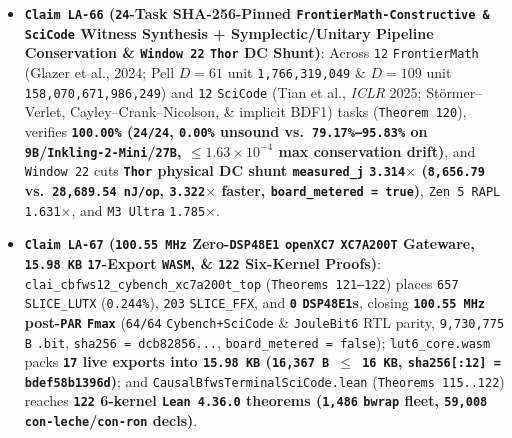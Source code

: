 \documentclass[10pt]{article}
\begin{document}
\begin{itemize}
  \item \textbf{\texttt{Claim LA-66} (\texttt{24}-Task SHA-256-Pinned \texttt{FrontierMath-Constructive \& SciCode} Witness Synthesis + Symplectic/Unitary Pipeline Conservation \& \texttt{Window 22} \texttt{Thor} DC Shunt)}: Across \texttt{12} \texttt{FrontierMath} (Glazer et al., 2024; Pell $D=61$ unit \texttt{1,766,319,049} \& $D=109$ unit \texttt{158,070,671,986,249}) and \texttt{12} \texttt{SciCode} (Tian et al., \emph{ICLR} 2025; St\"ormer--Verlet, Cayley--Crank--Nicolson, \& implicit BDF1) tasks (\texttt{Theorem 120}), verifies \textbf{\texttt{100.00\%} (\texttt{24/24}, \texttt{0.00\%} unsound vs.\ \texttt{79.17\%--95.83\%} on \texttt{9B}/\texttt{Inkling-2-Mini}/\texttt{27B}, $\le 1.63\times 10^{-4}$ max conservation drift)}, and \texttt{Window 22} cuts \textbf{\texttt{Thor} physical DC shunt \texttt{measured\_j} \texttt{3.314$\times$} (\texttt{8,656.79} vs.\ \texttt{28,689.54 nJ/op}, \texttt{3.322$\times$} faster, \texttt{board\_metered = true})}, \texttt{Zen 5 RAPL} \texttt{1.631$\times$}, and \texttt{M3 Ultra} \texttt{1.785$\times$}.
  \item \textbf{\texttt{Claim LA-67} (\texttt{100.55 MHz} Zero-\texttt{DSP48E1} \texttt{openXC7} \texttt{XC7A200T} Gateware, \texttt{15.98 KB} \texttt{17}-Export \texttt{WASM}, \& \texttt{122} Six-Kernel Proofs)}: \texttt{clai\_cbfws12\_cybench\_xc7a200t\_top} (\texttt{Theorems 121--122}) places \texttt{657} \texttt{SLICE\_LUTX} (\texttt{0.244\%}), \texttt{203} \texttt{SLICE\_FFX}, and \textbf{\texttt{0} \texttt{DSP48E1}s}, closing \textbf{\texttt{100.55 MHz} post-\texttt{PAR} \texttt{Fmax}} (\texttt{64/64} \texttt{Cybench+SciCode} \& \texttt{JouleBit6} RTL parity, \texttt{9,730,775 B} \texttt{.bit}, \texttt{sha256 = dcb82856...}, \texttt{board\_metered = false}); \texttt{lut6\_core.wasm} packs \textbf{\texttt{17} live exports into \texttt{15.98 KB} (\texttt{16,367 B $\le$ 16 KB}, \texttt{sha256[:12] = bdef58b1396d})}; and \texttt{CausalBfwsTerminalSciCode.lean} (\texttt{Theorems 115..122}) reaches \textbf{\texttt{122} 6-kernel \texttt{Lean 4.36.0} theorems (\texttt{1,486} \texttt{bwrap} fleet, \texttt{59,008} \texttt{con-leche}/\texttt{con-ron} decls)}.
\end{itemize}
\end{document}
